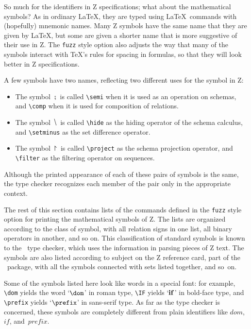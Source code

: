 So much for the identifiers in Z specifications; what about the
mathematical symbols?  As in ordinary \LaTeX, they are typed using
\LaTeX\ commands with (hopefully) mnemonic names.  Many Z symbols
have the same name that they are given by \LaTeX, but some are given
a shorter name that is more suggestive of their use in Z.  The
\verb/fuzz/ style option also adjusts the way that many of the
symbols interact with \TeX's rules for spacing in
formulas, so that
they will look better in Z \hbox{specifications}.

A few symbols have two names, reflecting two different uses for the
symbol in Z:
\begin{itemize}
\item The symbol $\semi$ is called 
\verb/\semi/\index{|\semi| ($\semi$)!}
when it is used as an operation on schemas, and 
\verb/\comp/\index{|\comp| ($\comp$)!}
when it is used for composition of relations.
\item The symbol $\hide$ is called
\verb/\hide/\index{|\hide| ($\hide$)!}
as the hiding operator of the schema calculus, and 
\verb/\setminus/%
\index{|\setminus| ($\setminus$)!} as the set difference operator. 
\item The symbol $\project$ is called
\verb/\project/%
\index{|\project| ($\project$)!} as the schema projection operator, and 
\verb/\filter/%
\index{|\filter| ($\filter$)!} as the filtering operator on sequences.
\end{itemize}
Although the printed appearance of
each of these pairs of symbols is the same, the type checker
recognizes each member of the pair only in the appropriate
\hbox{context}.

The rest of this section contains lists of the commands defined in
the \verb/fuzz/ style option for printing the mathematical symbols
of Z.  The lists are organized according to
the class of symbol, with all relation signs in one list, all binary
operators in another, and so on.  This classification of standard
symbols is known to the \fuzz\ type checker, which uses the
information in parsing pieces of Z text. The symbols are also listed
according to subject on the Z reference card, part of the \fuzz\
package, with all the symbols connected with sets listed together,
and so~on.

Some of the symbols listed here look like words in a special
font:
for example, \verb/\dom/ yields the word `$\dom$' in roman type,
\verb/\IF/ yields `$\bf if$' in bold-face type, and \verb/\prefix/
yields `$\prefix$' in sans-serif type.  As far as the type checker is
concerned, these symbols are completely different from plain
identifiers like $dom$, $if$, and~$prefix$.

